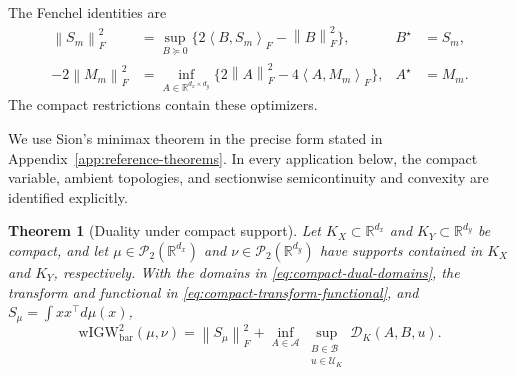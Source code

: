 \documentclass[11pt]{article}
\newcommand{\R}{\mathbb R}
\newcommand{\cP}{\mathcal P}
\newcommand{\cU}{\mathcal U}
\newcommand{\ip}[2]{\left\langle #1,#2\right\rangle}
\newcommand{\norm}[1]{\left\lVert #1\right\rVert}
\newcommand{\wIGW}{\mathrm{wIGW}_{\mathrm{bar}}}
\theoremstyle{plain}
\newtheorem{theorem}{Theorem}[section]
\theoremstyle{definition}
\theoremstyle{remark}
\begin{document}
The Fenchel identities are
\begin{equation}\label{eq:moment-fenchel-identities}
\begin{aligned}
  \norm{S_m}_F^2
  &=\sup_{B\succeq0}\{2\ip{B}{S_m}_F-\norm{B}_F^2\},
  &B^\star&=S_m,\\
  -2\norm{M_m}_F^2
  &=\inf_{A\in\R^{d_x\times d_y}}
    \{2\norm{A}_F^2-4\ip{A}{M_m}_F\},
  &A^\star&=M_m.
\end{aligned}
\end{equation}
The compact restrictions contain these optimizers.

We use Sion's minimax theorem in the precise form stated in
Appendix~\ref{app:reference-theorems}. In every application below, the compact
variable, ambient topologies, and sectionwise semicontinuity and convexity are
identified explicitly.

\begin{theorem}[Duality under compact support]\label{thm:compact-dual}
Let $K_X\subset\R^{d_x}$ and $K_Y\subset\R^{d_y}$ be compact, and let
\(\mu\in\cP_2(\R^{d_x})\) and \(\nu\in\cP_2(\R^{d_y})\) have supports
contained in \(K_X\) and \(K_Y\), respectively. With the domains in
\eqref{eq:compact-dual-domains}, the transform and functional in
\eqref{eq:compact-transform-functional}, and
\(S_\mu=\int xx^\top d\mu(x)\),
\[
  \wIGW^2(\mu,\nu)=\norm{S_\mu}_F^2+
  \inf_{A\in\mathcal A}\sup_{\substack{B\in\mathcal B\\u\in\cU_K}}
  \mathcal D_K(A,B,u).
\]
\end{theorem}
\end{document}
